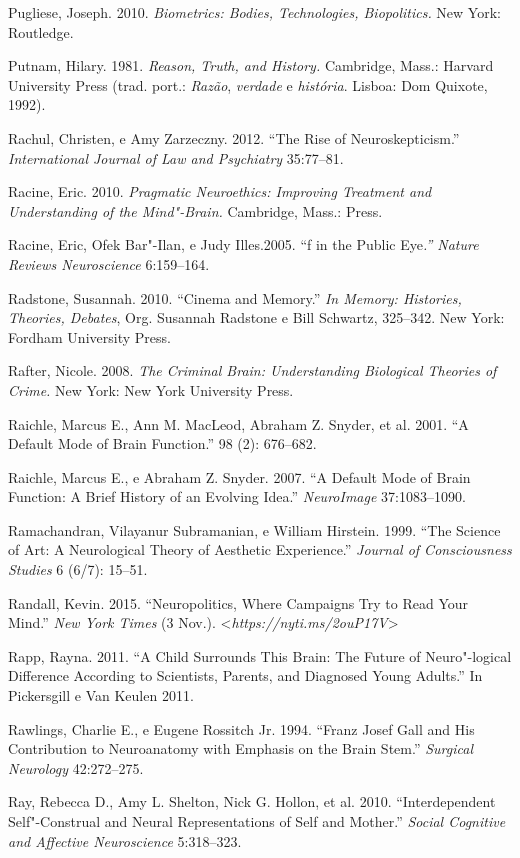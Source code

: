 {\begin{Parskip}
Pugliese, Joseph. 2010. \emph{Biometrics: Bodies, Technologies,
Biopolitics.} New York: Routledge.

Putnam, Hilary. 1981. \emph{Reason, Truth, and History.} Cambridge,
Mass.: Harvard University Press (trad. port.: \emph{Razão},
\emph{verdade} e \emph{história}. Lisboa: Dom Quixote, 1992).

Rachul, Christen, e Amy Zarzeczny. 2012. ``The Rise of
Neuroskepticism.'' \emph{International Journal of Law and Psychiatry}
35:77--81.

Racine, Eric. 2010. \emph{Pragmatic Neuroethics: Improving Treatment and
Understanding of the Mind"-Brain.} Cambridge, Mass.:  Press.

Racine, Eric, Ofek Bar"-Ilan, e Judy Illes.2005. ``f in the Public
Eye\emph{.'' Nature Reviews Neuroscience} 6:159--164.

Radstone, Susannah. 2010. ``Cinema and Memory.'' \emph{In Memory:
Histories, Theories, Debates}, Org. Susannah Radstone e Bill Schwartz,
325--342. New York: Fordham University Press.

Rafter, Nicole. 2008. \emph{The Criminal Brain: Understanding Biological
Theories of Crime.} New York: New York University Press.

Raichle, Marcus E., Ann M. MacLeod, Abraham Z. Snyder, et al. 2001. ``A
Default Mode of Brain Function.'' \emph{} 98 (2): 676--682.

Raichle, Marcus E., e Abraham Z. Snyder. 2007. ``A Default Mode of Brain
Function: A Brief History of an Evolving Idea.'' \emph{NeuroImage}
37:1083--1090.

Ramachandran, Vilayanur Subramanian, e William Hirstein. 1999. ``The
Science of Art: A Neurological Theory of Aesthetic Experience.''
\emph{Journal of Consciousness Studies} 6 (6/7): 15--51.

Randall, Kevin. 2015. ``Neuropolitics, Where Campaigns Try to Read Your
Mind.'' \emph{New York Times} (3 Nov.).
\textless{}\emph{https://nyti.ms/2ouP17V}\textgreater{}

Rapp, Rayna. 2011. ``A Child Surrounds This Brain: The Future of
Neuro"-logical Difference According to Scientists, Parents, and Diagnosed
Young Adults.'' In Pickersgill e Van Keulen 2011.

Rawlings, Charlie E., e Eugene Rossitch Jr. 1994. ``Franz Josef Gall and
His Contribution to Neuroanatomy with Emphasis on the Brain Stem.''
\emph{Surgical Neurology} 42:272--275.

Ray, Rebecca D., Amy L. Shelton, Nick G. Hollon, et al. 2010.
``Interdependent Self"-Construal and Neural Representations of Self and
Mother.'' \emph{Social Cognitive and Affective Neuroscience} 5:318--323.


\end{Parskip}}
